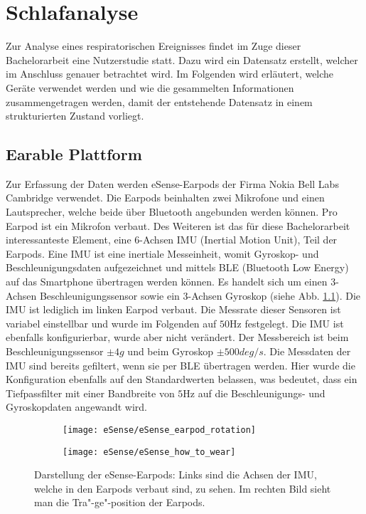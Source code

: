 
\chapter{Schlafanalyse}
\label{ch:sa}
Zur Analyse eines respiratorischen Ereignisses findet im Zuge dieser Bachelorarbeit eine Nutzerstudie statt. 
Dazu wird ein Datensatz erstellt, welcher im Anschluss genauer betrachtet wird. 
Im Folgenden wird erläutert, welche Geräte verwendet werden und wie die gesammelten Informationen zusammengetragen werden, damit der entstehende Datensatz in einem strukturierten Zustand vorliegt.

\section{Earable Plattform}
\label{ch:sa:ep}
Zur Erfassung der Daten werden eSense-Earpods der Firma {\glqq Nokia Bell Labs Cambridge\grqq} verwendet.	
Die Earpods beinhalten zwei Mikrofone und einen Lautsprecher, welche beide über Bluetooth angebunden werden können.
Pro Earpod ist ein Mikrofon verbaut.
Des Weiteren ist das für diese Bachelorarbeit interessanteste Element, eine 6-Achsen IMU (Inertial Motion Unit), Teil der Earpods.
Eine IMU ist eine inertiale Messeinheit, womit Gyroskop- und Beschleunigungsdaten aufgezeichnet und mittels BLE (Bluetooth Low Energy) auf das Smartphone übertragen werden können. 
Es handelt sich um einen 3-Achsen Beschleunigungssensor sowie ein 3-Achsen Gyroskop (siehe Abb. \ref{analysis:eSense:images}).
Die IMU ist lediglich im linken Earpod verbaut.
Die Messrate dieser Sensoren ist variabel einstellbar und wurde im Folgenden auf $50 \si{\hertz}$ festgelegt.
Die IMU ist ebenfalls konfigurierbar, wurde aber nicht verändert. 
Der Messbereich ist beim Beschleunigungssensor $\pm 4g$ und beim Gyroskop $\pm 500deg/s$.
Die Messdaten der IMU sind bereits gefiltert, wenn sie per BLE übertragen werden.
Hier wurde die Konfiguration ebenfalls auf den Standardwerten belassen, was bedeutet, dass ein Tiefpassfilter mit einer Bandbreite von $5\si{\hertz}$ auf die Beschleunigungs- und Gyroskopdaten angewandt wird.

\begin{figure}[ht]
    \centering
    \begin{subfigure}{.49\textwidth}
      \texttt{[image: eSense/eSense\_earpod\_rotation]}
    \end{subfigure}
    \begin{subfigure}{.49\textwidth}
      \texttt{[image: eSense/eSense\_how\_to\_wear]}
    \end{subfigure}
    \caption{Darstellung der eSense-Earpods: Links sind die Achsen der IMU, welche in den Earpods verbaut sind, zu sehen. Im rechten Bild sieht man die Tra"-ge"-position der Earpods.}
    \label{analysis:eSense:images}
  \end{figure}

